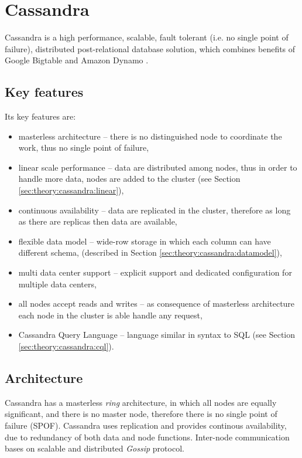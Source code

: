 
\section{Cassandra}
\label{sec:theory:cassandra}
Cassandra \cite{CassandraApacheDocs} \cite{CassandraDataStaxDocs} \cite{lakshman2010cassandra} is a high performance, scalable, fault tolerant (i.e. no single point of failure), distributed post-relational database solution, which combines benefits of Google Bigtable \cite{chang2008bigtable} and Amazon Dynamo \cite{decandia2007dynamo}.

\subsection{Key features}
Its key features are:
\begin{itemize}
\item masterless architecture -- there is no distinguished node to coordinate the work, thus no single point of failure,
\item linear scale performance -- data are distributed among nodes, thus in order to handle more data, nodes are added to the cluster (see Section \ref{sec:theory:cassandra:linear}),
\item continuous availability -- data are replicated in the cluster, therefore as long as there are replicas then data are available,
\item flexible data model -- wide-row storage in which each column can have different schema, (described in Section \ref{sec:theory:cassandra:datamodel}),
\item multi data center support -- explicit support and dedicated configuration for multiple data centers,
\item all nodes accept reads and writes -- as consequence of masterless architecture each node in the cluster is able handle any request, 
\item Cassandra Query Language -- language similar in syntax to SQL (see Section \ref{sec:theory:cassandra:cql}).
\end{itemize}

\subsection{Architecture}
Cassandra has a masterless \emph{ring} architecture, in which all nodes are equally significant, and there is no master node, therefore there is no single point of failure (SPOF). Cassandra uses replication and provides continous availability, due to redundancy of both data and node functions.
Inter-node communication bases on scalable and distributed \emph{Gossip} protocol.

